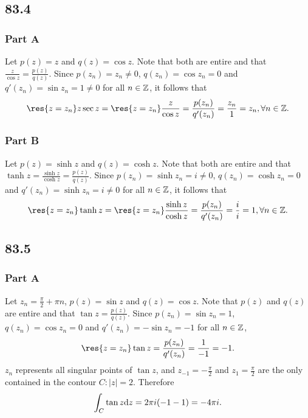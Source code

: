 \documentclass[12pt]{extarticle}
\begin{document}
\subsection*{83.4}
\begin{problem} \subsubsection*{Part A}
    Let $p(z) = z$ and $q(z) = \cos z$. Note that both are entire and that $\frac{z}{\cos z} = \frac{p(z)}{q(z)}$. Since $p(z_n) = z_n \neq 0$, $q(z_n) = \cos z_n = 0$ and $q'(z_n) = \sin z_n = 1 \neq 0$ for all $n \in \mathbb{Z}$, it follows that
    \[
        \res{z=z_n} z \sec z = \res{z=z_n} \frac{z}{\cos z} = \frac{p(z_n)}{q'(z_n)} = \frac{z_n}{1} = z_n, \forall n \in \Z
    .\]
\end{problem}

\begin{problem} \subsubsection*{Part B}
    Let $p(z) = \sinh z$ and $q(z) = \cosh z$. Note that both are entire and that $\tanh z = \frac{\sinh z}{\cosh z} = \frac{p(z)}{q(z)}$. Since $p(z_n) = \sinh z_n = i \neq 0$, $q(z_n) = \cosh z_n = 0$ and $q'(z_n) = \sinh z_n = i \neq 0$ for all $n \in \mathbb{Z}$, it follows that
    \[
        \res{z=z_n} \tanh z = \res{z=z_n} \frac{\sinh z}{\cosh z} = \frac{p(z_n)}{q'(z_n)} = \frac{i}{i} = 1, \forall n \in \Z
    .\]
\end{problem}

\subsection*{83.5}
\begin{problem} \subsubsection*{Part A}
    Let $z_n = \frac{\pi}{2} + \pi n$, $p(z) = \sin z$ and $q(z) = \cos z$. Note that $p(z)$ and $q(z)$ are entire and that $\tan z = \frac{p(z)}{q(z)}$. Since $p(z_n) = \sin z_n = 1$, $q(z_n) = \cos z_n = 0$ and $q'(z_n) = -\sin z_n = -1$ for all $n \in \mathbb{Z}$,
    \[
        \res{z=z_n} \tan z = \frac{p(z_n)}{q'(z_n)} = \frac{1}{-1} = -1
    .\]
    $z_n$ represents all singular points of $\tan z$, and $z_{-1} = -\frac{\pi}{2}$ and $z_1 = \frac{\pi}{2}$ are the only contained in the contour $C : |z| = 2$. Therefore
    \[
        \int_C \tan z \dd z = 2 \pi i \qty(-1 - 1) = -4 \pi i
    .\]
\end{problem}
\end{document}
